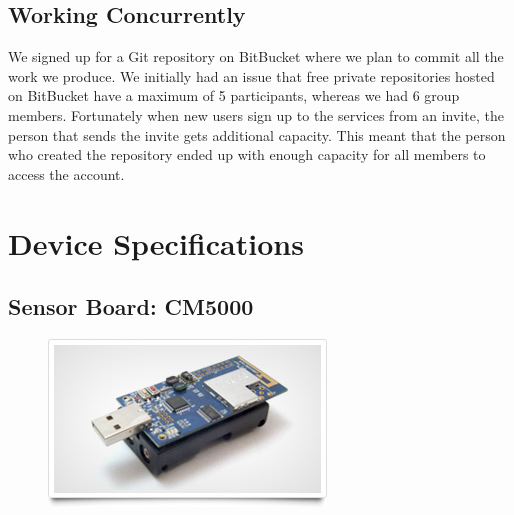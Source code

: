 \documentclass[a4paper]{article}
\begin{document}
\subsection{Working Concurrently}

We signed up for a Git repository on BitBucket \cite{?} where we plan to commit all the work we produce. We initially had an issue that free private repositories hosted on BitBucket have a maximum of 5 participants, whereas we had 6 group members. Fortunately when new users sign up to the services from an invite, the person that sends the invite gets additional capacity. This meant that the person who created the repository ended up with enough capacity for all members to access the account.

\clearpage

\appendixpage
\addappheadtotoc
\appendix

\section{Device Specifications}

\subsection{Sensor Board: CM5000}

\begin{figure}[H]
\centering
\includegraphics[scale=0.5]{Images/CM5000}
\end{figure}
\end{document}
